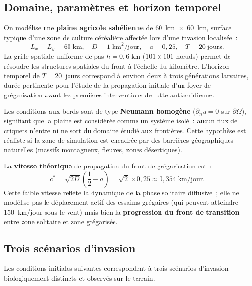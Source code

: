 \documentclass[11pt,a4paper]{report}
\begin{document}
\subsection*{Domaine, param\`etres et horizon temporel}

On mod\'elise une \textbf{plaine agricole sah\'elienne} de 60~km~$\times$~60~km,
surface typique d'une zone de culture c\'er\'ealière affectée lors d'une invasion
localis\'ee~:
\begin{equation}
  L_x = L_y = 60\;\text{km},\quad D = 1\;\text{km}^2/\text{jour},
  \quad a = 0{,}25,\quad T = 20\;\text{jours}.
\end{equation}
La grille spatiale uniforme de pas $h = 0{,}6\;\text{km}$ ($101\times101$ n\oe{}uds)
permet de r\'esoudre les structures spatiales du front \`a l'\'echelle du kilom\`etre.
L'horizon temporel de $T = 20$~jours correspond \`a environ deux \`a trois g\'en\'erations
larvaires, dur\'ee pertinente pour l'\'etude de la propagation initiale d'un foyer
de gr\'egarisation avant les premi\`eres interventions de lutte antiacridienne.

Les conditions aux bords sont de type \textbf{Neumann homog\`ene}
($\partial_n u = 0$ sur $\partial\Omega$), signifiant que la plaine est
consid\'er\'ee comme un syst\`eme isol\'e~: aucun flux de criquets n'entre
ni ne sort du domaine \'etudi\'e aux fronti\`eres. Cette hypoth\`ese est
r\'ealiste si la zone de simulation est encadr\'ee par des barri\`eres g\'eographiques
naturelles (massifs montagneux, fleuves, zones d\'esertiques).

La \textbf{vitesse th\'eorique} de propagation du front de gr\'egarisation est~:
\begin{equation}
  c^* = \sqrt{2D}\left(\frac{1}{2}-a\right)
      = \sqrt{2}\times 0{,}25
      \approx 0{,}354\;\text{km/jour}.
\end{equation}
Cette faible vitesse refl\`ete la dynamique de la phase solitaire diffusive~; elle
ne mod\'elise pas le d\'eplacement actif des essaims gr\'egaires (qui peuvent atteindre
150~km/jour sous le vent) mais bien la \textbf{progression du front de transition}
entre zone solitaire et zone grégarisée.

\subsection*{Trois sc\'enarios d'invasion}

Les conditions initiales suivantes correspondent \`a trois sc\'enarios
d'invasion biologiquement distincts et observ\'es sur le terrain.
\end{document}

